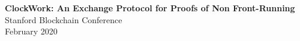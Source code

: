 
\textbf{ClockWork: An Exchange Protocol for Proofs of Non Front-Running} \\
Stanford Blockchain Conference \\
February 2020
